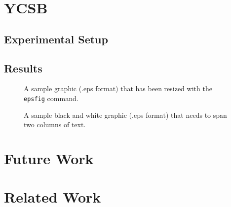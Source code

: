 \documentclass{sig-alternate}
\begin{document}
\section{YCSB}


\subsection{Experimental Setup}

\subsection{Results}
%

\begin{figure}
\centering
{}
\caption{A sample graphic (.eps format)
that has been resized with the \texttt{epsfig} command.}
\end{figure}


\begin{figure*}
\centering
{}
\caption{A sample black and white graphic (.eps format)
that needs to span two columns of text.}
\end{figure*}

\section{Future Work}

\section{Related Work}
\end{document}

